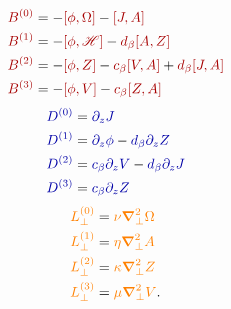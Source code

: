\documentclass[12pt, letterpaper, oneside, leqno, openright]{memoir}
\newcommand{\hfield}{\mathscr{H}}
\begin{document}
%
\begin{subequations}
\begin{align}
  {\color{red!65!black}B^{(0)}}  &= -{\color{red!65!black}[\phi,\Omega]}  
                                    -{\color{red!65!black}[J,A]}                                             \label{eq:ffbzero} \\
  {\color{red!65!black}B^{(1)}}  &= -{\color{red!65!black}[\phi,\hfield]}
                                    -{\color{red!65!black}d_\beta[A,Z]}                                      \label{eq:ffbone}  \\
  {\color{red!65!black}B^{(2)}}  &= -{\color{red!65!black}[\phi,Z]}       
                                    -{\color{red!65!black}c_\beta[V,A]} + {\color{red!65!black}d_\beta[J,A]} \label{eq:ffbtwo}  \\
  {\color{red!65!black}B^{(3)}}  &= -{\color{red!65!black}[\phi,V]}      
                                    -{\color{red!65!black}c_\beta[Z,A]}                                      \label{eq:ffbthree}
\end{align}
\end{subequations}
%                                   
\begin{subequations}
\begin{align}
  {\color{blue!65!black}D^{(0)}} &=  {\color{blue!65!black} \pardz J }       \label{eq:ffdzero}                       \\
  {\color{blue!65!black}D^{(1)}} &=  {\color{blue!65!black}\pardz\phi}      
                                    -{\color{blue!65!black}d_\beta\pardz Z}  \label{eq:ffdone}                        \\
  {\color{blue!65!black}D^{(2)}} &=  {\color{blue!65!black}c_\beta\pardz V} 
                                    -{\color{blue!65!black}d_\beta\pardz J}  \label{eq:ffdtwo}                        \\
  {\color{blue!65!black}D^{(3)}} &=  {\color{blue!65!black}c_\beta\pardz Z}  \label{eq:ffdthree}
\end{align}
\end{subequations}
%                                   
\begin{subequations}
\begin{align}
  {\color{orange}L^{(0)}_\perp} &= {\color{orange}\nu\boldsymbol{\nabla}_\perp^2   \Omega}    \label{eq:fflzero}                       \\
  {\color{orange}L^{(1)}_\perp} &= {\color{orange}\eta\boldsymbol{\nabla}_\perp^2   A}        \label{eq:fflone}                        \\
  {\color{orange}L^{(2)}_\perp} &= {\color{orange}\kappa\boldsymbol{\nabla}_\perp^2 Z}        \label{eq:ffltwo}                        \\
  {\color{orange}L^{(3)}_\perp} &= {\color{orange}\mu\boldsymbol{\nabla}_\perp^2    V}.       \label{eq:fflthree} 
\end{align}
\end{subequations}
\end{document}
